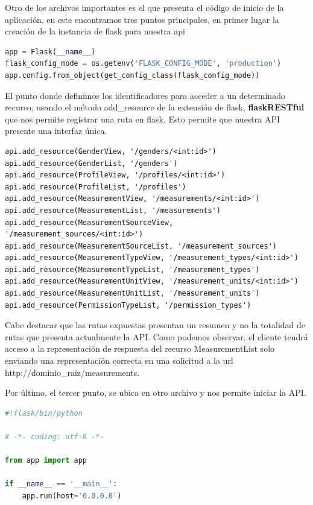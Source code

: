 Otro de los archivos importantes es el que presenta el código de inicio de la aplicación, en este encontramos tres puntos principales, en primer lugar la creación de la instancia de flask para nuestra api

\begin{lstlisting}[language=Python]
app = Flask(__name__)
flask_config_mode = os.getenv('FLASK_CONFIG_MODE', 'production')
app.config.from_object(get_config_class(flask_config_mode))
\end{lstlisting}

El punto donde definimos los identificadores para acceder a un determinado recurso, usando el método add\_resource de la extensión de flask, \textbf{flaskRESTful} que nos permite registrar una ruta en flask. Esto permite que nuestra API presente una interfaz única.

\begin{lstlisting}
api.add_resource(GenderView, '/genders/<int:id>')
api.add_resource(GenderList, '/genders')
api.add_resource(ProfileView, '/profiles/<int:id>')
api.add_resource(ProfileList, '/profiles')
api.add_resource(MeasurementView, '/measurements/<int:id>')
api.add_resource(MeasurementList, '/measurements')
api.add_resource(MeasurementSourceView, '/measurement_sources/<int:id>')
api.add_resource(MeasurementSourceList, '/measurement_sources')
api.add_resource(MeasurementTypeView, '/measurement_types/<int:id>')
api.add_resource(MeasurementTypeList, '/measurement_types')
api.add_resource(MeasurementUnitView, '/measurement_units/<int:id>')
api.add_resource(MeasurementUnitList, '/measurement_units')
api.add_resource(PermissionTypeList, '/permission_types')
\end{lstlisting}

Cabe destacar que las rutas expuestas presentan un resumen y no la totalidad de rutas que presenta actualmente la API.
Como podemos observar, el cliente tendrá acceso a la representación de respuesta del recurso MeasurementList solo enviando una representación correcta en una solicitud a la url http://dominio\_raiz/measurements.

Por último, el tercer punto, se ubica en otro archivo y nos permite iniciar la API.

\begin{lstlisting}[language=Python]
#!flask/bin/python

# -*- coding: utf-8 -*-

from app import app

if __name__ == '__main__':
    app.run(host='0.0.0.0')
\end{lstlisting}

